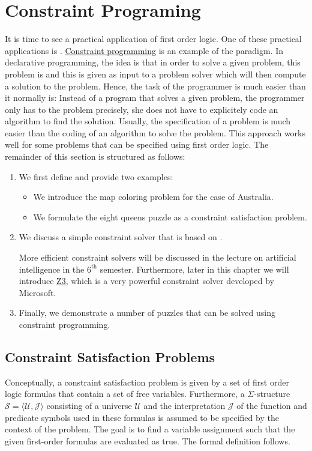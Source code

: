 \section{Constraint Programing}
It is time to see a practical application of first order logic.  One of these practical applications is .  
\href{https://en.wikipedia.org/wiki/Constraint_programming}{Constraint programming} is an example of the
  paradigm.  In declarative programming, the idea is that 
in order to solve a given problem, this problem is  and this  is
given as input to a problem solver which will then compute a solution to the problem.  Hence, the task of the
programmer is much easier than it normally is: Instead of  a program that solves a given problem,
the programmer only has to  the problem precisely, she does not have to explicitely code an algorithm to find the
solution.  Usually, the specification of a problem is much easier than the coding of an algorithm to solve the problem.  This approach works well for some problems
that can be specified using first order logic.  The remainder of this section is structured as follows:
\begin{enumerate}
\item We first define  and provide two examples:
      \begin{itemize}
      \item We introduce the map coloring problem for the case of Australia.
      \item We formulate the eight queens puzzle as a constraint satisfaction problem.  
      \end{itemize}
\item We discuss a simple constraint solver that is based on .

      More efficient constraint solvers will be discussed in the lecture on artificial intelligence in the
      $6^{\mathrm{th}}$ semester.  Furthermore, later in this chapter we will introduce
      \href{https://www.microsoft.com/en-us/research/project/z3-3/}{Z3}, which is a very powerful
      constraint solver developed by Microsoft.
\item Finally, we demonstrate a number of puzzles that can be solved using constraint programming.
\end{enumerate}

\subsection{Constraint Satisfaction Problems}
Conceptually, a constraint satisfaction problem is given by a set of first order logic formulas that contain a
set of free variables.  Furthermore, a $\Sigma$-structure $\mathcal{S} = \langle \mathcal{U},
\mathcal{J}\rangle $
consisting of a universe $\mathcal{U}$ and the interpretation $\mathcal{J}$ of the function and predicate 
symbols used in these formulas is assumed to be specified by the context of the problem.  The goal is 
to find a variable assignment such that the given first-order formulas are evaluated as true.  The formal
definition follows.

